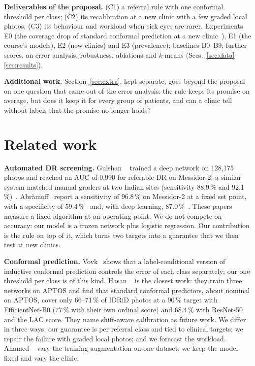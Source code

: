 \documentclass[10pt,twocolumn,letterpaper]{article}
\newcommand{\pct}{\,\%}
\begin{document}
\textbf{Deliverables of the proposal.} (C1) a referral rule with one conformal threshold per class; (C2) its recalibration at a new clinic with a few graded local photos; (C3) its behaviour and workload when sick eyes are rarer. Experiments E0 (the coverage drop of standard conformal prediction at a new clinic~\cite{hasan}), E1 (the course's models), E2 (new clinics) and E3 (prevalence); baselines B0--B9; further scores, an error analysis, robustness, ablations and $k$-means (Secs.~\ref{sec:data}--\ref{sec:results}).

\textbf{Additional work.} Section~\ref{sec:extra}, kept separate, goes beyond the proposal on one question that came out of the error analysis: the rule keeps its promise on average, but does it keep it for every group of patients, and can a clinic tell without labels that the promise no longer holds?

\section{Related work}
\textbf{Automated DR screening.} Gulshan \etal~\cite{gulshan16} trained a deep network on 128,175 photos and reached an AUC of 0.990 for referable DR on Messidor-2; a similar system matched manual graders at two Indian sites (sensitivity 88.9\pct{} and 92.1\pct)~\cite{gulshan19}. Abr\`amoff \etal\ report a sensitivity of 96.8\pct{} on Messidor-2 at a fixed set point, with a specificity of 59.4\pct~\cite{abramoff13} and, with deep learning, 87.0\pct~\cite{abramoff16}. These papers measure a fixed algorithm at an operating point. We do not compete on accuracy: our model is a frozen network plus logistic regression. Our contribution is the rule on top of it, which turns two targets into a guarantee that we then test at new clinics.

\textbf{Conformal prediction.} Vovk~\cite{vovk} shows that a label-conditional version of inductive conformal prediction controls the error of each class separately; our one threshold per class is of this kind. Hasan \etal~\cite{hasan} is the closest work: they train three networks on APTOS and find that standard conformal predictors, about nominal on APTOS, cover only 66--71\pct{} of IDRiD photos at a 90\pct{} target with EfficientNet-B0 (77\pct{} with their own ordinal score) and 68.4\pct{} with ResNet-50 and the LAC score. They name shift-aware calibration as future work. We differ in three ways: our guarantee is per referral class and tied to clinical targets; we repair the failure with graded local photos; and we forecast the workload. Ahamed \etal~\cite{ahamed} vary the training augmentation on one dataset; we keep the model fixed and vary the clinic.
\end{document}
